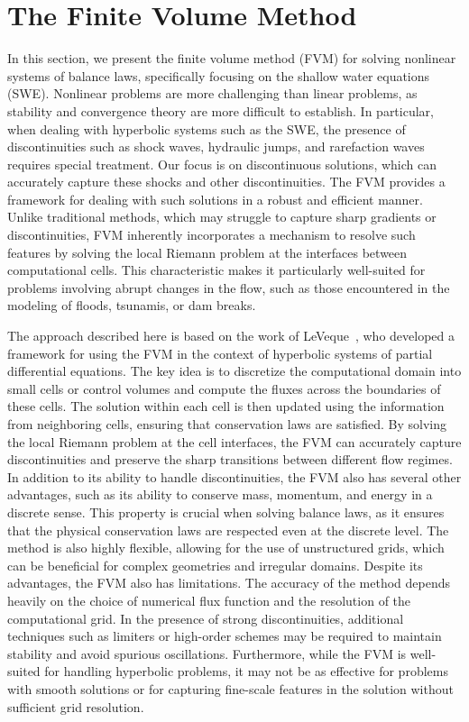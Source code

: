 \chapter{The Finite Volume Method}\label{ch:fvm}
In this section, we present the finite volume method (FVM) for solving nonlinear systems of balance laws, specifically focusing on the shallow water equations (SWE).
Nonlinear problems are more challenging than linear problems, as stability and convergence theory are more difficult to establish.
In particular, when dealing with hyperbolic systems such as the SWE, the presence of discontinuities such as shock waves, hydraulic jumps, and rarefaction waves requires special treatment.
Our focus is on discontinuous solutions, which can accurately capture these shocks and other discontinuities.
The FVM provides a framework for dealing with such solutions in a robust and efficient manner.
Unlike traditional methods, which may struggle to capture sharp gradients or discontinuities, FVM inherently incorporates a mechanism to resolve such features by solving the local Riemann problem at the interfaces between computational cells.
This characteristic makes it particularly well-suited for problems involving abrupt changes in the flow, such as those encountered in the modeling of floods, tsunamis, or dam breaks.

The approach described here is based on the work of LeVeque~\cite{LeVeque2002}, who developed a framework for using the FVM in the context of hyperbolic systems of partial differential equations.
The key idea is to discretize the computational domain into small cells or control volumes and compute the fluxes across the boundaries of these cells.
The solution within each cell is then updated using the information from neighboring cells, ensuring that conservation laws are satisfied.
By solving the local Riemann problem at the cell interfaces, the FVM can accurately capture discontinuities and preserve the sharp transitions between different flow regimes.
In addition to its ability to handle discontinuities, the FVM also has several other advantages, such as its ability to conserve mass, momentum, and energy in a discrete sense.
This property is crucial when solving balance laws, as it ensures that the physical conservation laws are respected even at the discrete level.
The method is also highly flexible, allowing for the use of unstructured grids, which can be beneficial for complex geometries and irregular domains.
Despite its advantages, the FVM also has limitations. The accuracy of the method depends heavily on the choice of numerical flux function and the resolution of the computational grid.
In the presence of strong discontinuities, additional techniques such as limiters or high-order schemes may be required to maintain stability and avoid spurious oscillations.
Furthermore, while the FVM is well-suited for handling hyperbolic problems, it may not be as effective for problems with smooth solutions or for capturing fine-scale features in the solution without sufficient grid resolution.


